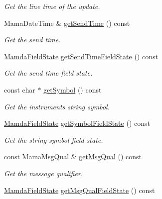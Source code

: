 \begin{CompactItemize}
\begin{CompactList}\small\item\em Get the line time of the update. \item\end{CompactList}\item 
Mama\-Date\-Time \& \hyperlink{classWombat_1_1MamdaOrderImbalanceListener_ccbfe5ac89809e35624d42faa0c40a1b}{get\-Send\-Time} () const 
\begin{CompactList}\small\item\em Get the send time. \item\end{CompactList}\item 
\hyperlink{namespaceWombat_93aac974f2ab713554fd12a1fa3b7d2a}{Mamda\-Field\-State} \hyperlink{classWombat_1_1MamdaOrderImbalanceListener_938d4210b58560bf6ee8cb155546a3d8}{get\-Send\-Time\-Field\-State} () const 
\begin{CompactList}\small\item\em Get the send time field state. \item\end{CompactList}\item 
const char $\ast$ \hyperlink{classWombat_1_1MamdaOrderImbalanceListener_de961c5bbeedc9f69136682e1adaf495}{get\-Symbol} () const 
\begin{CompactList}\small\item\em Get the instruments string symbol. \item\end{CompactList}\item 
\hyperlink{namespaceWombat_93aac974f2ab713554fd12a1fa3b7d2a}{Mamda\-Field\-State} \hyperlink{classWombat_1_1MamdaOrderImbalanceListener_0598f54a0e0c05667551187418173c22}{get\-Symbol\-Field\-State} () const 
\begin{CompactList}\small\item\em Get the string symbol field state. \item\end{CompactList}\item 
const Mama\-Msg\-Qual \& \hyperlink{classWombat_1_1MamdaOrderImbalanceListener_5420e2c89b36475cf11a698bda2fdb05}{get\-Msg\-Qual} () const 
\begin{CompactList}\small\item\em Get the message qualifier. \item\end{CompactList}\item 
\hyperlink{namespaceWombat_93aac974f2ab713554fd12a1fa3b7d2a}{Mamda\-Field\-State} \hyperlink{classWombat_1_1MamdaOrderImbalanceListener_5847f899d32947c2d9a0356733f84e78}{get\-Msg\-Qual\-Field\-State} () const 

\end{CompactItemize}
